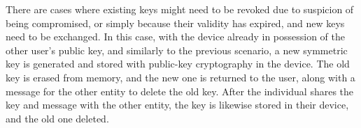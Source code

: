 There are cases where existing keys might need to be revoked due to suspicion of being compromised, or simply because their validity has expired, and new keys need to be exchanged. In this case, with the device already in possession of the other user's public key, and similarly to the previous scenario, a new symmetric key is generated and stored with public-key cryptography in the device. The old key is erased from memory, and the new one is returned to the user, along with a message for the other entity to delete the old key. After the individual shares the key and message with the other entity, the key is likewise stored in their device, and the old one deleted.

